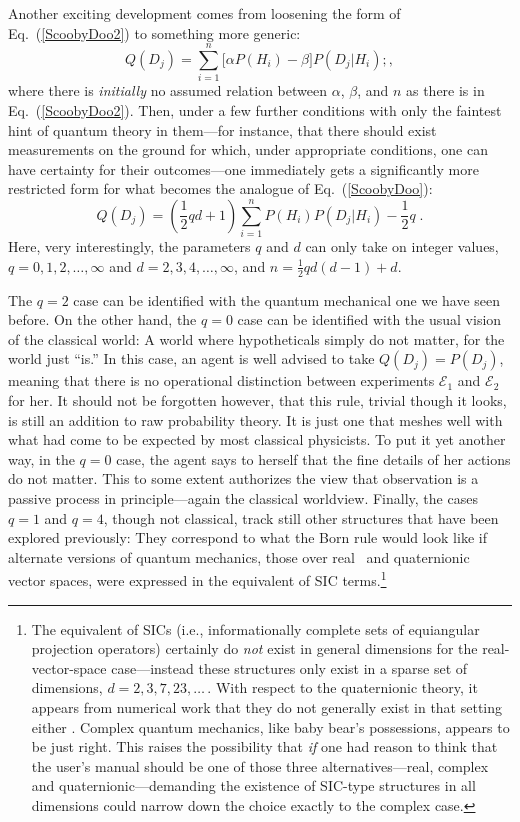 \documentclass[aps,pra,superscriptaddress,10pt,tightenlines,twocolumn,nofootinbib]{revtex4}
\begin{document}
Another exciting development comes from loosening the form of Eq.~(\ref{ScoobyDoo2}) to something more generic:
\begin{equation}
Q(D_j)=\sum_{i=1}^n \big[\alpha P(H_i) -\beta\big] P(D_j|H_i);,
\end{equation}
where there is {\it initially\/} no assumed relation between $\alpha$, $\beta$, and $n$ as there is in Eq.~(\ref{ScoobyDoo2}).  Then, under a few further conditions with only the faintest hint of quantum theory in them---for instance, that there should exist measurements on the ground for which, under appropriate conditions, one can have certainty for their outcomes---one immediately gets a significantly more restricted form for what becomes the analogue of Eq.~(\ref{ScoobyDoo}):
\begin{equation}
Q(D_j)=\left(\frac{1}{2} qd+1\right)\sum_{i=1}^{n} P(H_i) P(D_j|H_i) - \frac12 q\;.
\label{ExNihiloOmnia}
\end{equation}
Here, very interestingly, the parameters $q$ and $d$ can only take on integer values, $q=0,1,2,\ldots,\infty$ and $d=2,3,4,\ldots,\infty$, and $n=\frac12 qd(d-1) + d$.

The $q=2$ case can be identified with the quantum me\-chanical one we have seen before.  On the other hand, the $q=0$ case can be identified with the usual vision of the classical world:  A world where hypotheticals simply do not matter, for the world just ``is.''  In this case, an agent is well advised to take $Q(D_j)=P(D_j)$, meaning that there is no operational distinction between experiments ${\mathcal E}_1$ and ${\mathcal E}_2$ for her. It should not be forgotten however, that this rule, trivial though it looks, is still an addition to raw probability theory.  It is just one that meshes well with what had come to be expected by most classical physicists.  To put it yet another way, in the $q=0$ case, the agent says to herself that the fine details of her actions do not matter. This to some extent authorizes the view that observation is a passive process in principle---again the classical worldview.  Finally, the cases $q=1$ and $q=4$, though not classical, track still other structures that have been explored previously:  They correspond to what the Born rule would look like if alternate versions of quantum mechanics, those over real~\cite{Stueckelberg60} and quaternionic~\cite{AdlerBook} vector spaces, were expressed in the equivalent of SIC terms.\footnote{The equivalent of SICs (i.e., informationally complete sets of equiangular projection operators) certainly do {\it not\/} exist in general dimensions for the real-vector-space case---instead these structures only exist in a sparse set of dimensions, $d=2,3,7,23,\ldots\,$. With respect to the quaternionic theory, it appears from numerical work that they do not generally exist in that setting either \cite{Khatirinejad08}.  Complex quantum mechanics, like baby bear's possessions, appears to be just right.  This raises the possibility that {\it if\/} one had reason to think that the user's manual should be one of those three alternatives---real, complex and quaternionic---demanding the existence of SIC-type structures in all dimensions could narrow down the choice exactly to the complex case.}
\end{document}
